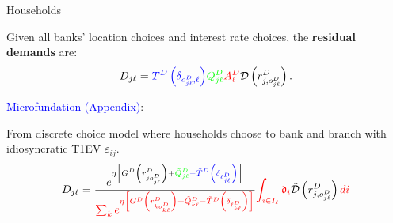 \documentclass[notes,10pt, aspectratio=169]{beamer}
\newenvironment{wideitemize}{\itemize\addtolength{\itemsep}{10pt}}{\enditemize}
\begin{document}
\begin{frame}{ Households}

    \begin{wideitemize}
        

        \item Given all banks' location choices and interest rate choices, the \textbf{residual demands} are:
        $$\begin{gathered}D_{j \ell}= \textcolor{blue}{T^D\left(\delta_{o_{j \ell}^D, \ell}\right)}  \textcolor{green}{Q_{j \ell}^D }\textcolor{red}{A_{\ell}^D} \mathcal{D}\left(r_{j, o_{j \ell}^D}^D\right) .\end{gathered}$$ %



    \textcolor{blue}{Microfundation (Appendix)}:
    \vspace{0.3cm}
        \begin{wideitemize}
            \item From discrete choice model where households choose to bank and branch with idiosyncratic T1EV $\varepsilon_{ij}$. 
\begin{equation*}
D_{j \ell}  =\frac{e^{\eta\left[G^D\left(r_{j o_{j \ell}^D}^D\right)+ \textcolor{green}{\tilde{Q}_{j \ell}^D }\textcolor{blue}{-\tilde{T}^D\left(\delta_{\ell_{j \ell}^D}\right)}\right]}}{ \textcolor{red}{\sum_k e^{\eta\left[G^D\left(r_{k o_{k \ell}^D}^D\right)+\tilde{Q}_{k \ell}^D-\tilde{T}^D\left(\delta_{\ell_{k \ell}^D}\right)\right]}}}  \textcolor{red}{\int_{i \in I_{\ell}} \mathfrak{d}_i }\tilde{\mathcal{D}}\left(r_{j, o_{j \ell}^D}^D\right) \textcolor{red}{ d i }%
\end{equation*}



\end{wideitemize}
\end{wideitemize}
\end{frame}
\end{document}

